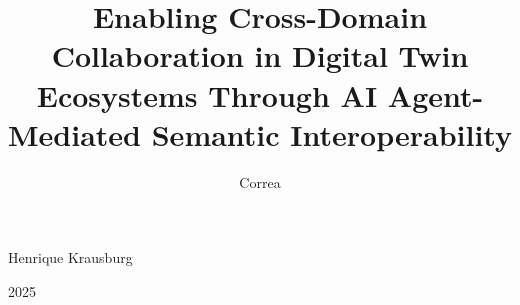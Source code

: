 \title{Enabling Cross-Domain Collaboration in Digital Twin Ecosystems Through AI Agent-Mediated Semantic Interoperability}
\author{Correa}{Henrique Krausburg}
\date{}{2025}
